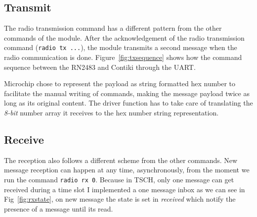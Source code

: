%



\subsection{Transmit}

The radio transmission command has a different pattern from the other commands
of the module.
After the acknowledgement of the radio transmission command (\lstinline{radio tx ...}),
the module transmits a second message when the radio communication is done.
Figure~\ref{fig:txsequence} shows how the command sequence between the RN2483
and Contiki through the UART.



Microchip chose to represent the payload as string formatted hex number to
facilitate the manual writing of commands, making the message payload twice as
long as its original content.
The driver function has to take care of translating the \emph{8-bit} number
array it receives to the hex number string representation.

\subsection{Receive}

The reception also follows a different scheme from the other commands.
New message reception can happen at any time, asynchronously, from the moment
we run the command \lstinline{radio rx 0}.
Because in TSCH, only one message can get received during a time slot
I implemented a one message inbox as we can see in Fig~\ref{fig:rxstate},
on new message the state is set in \emph{received} which notify the presence
of a message until its read.

